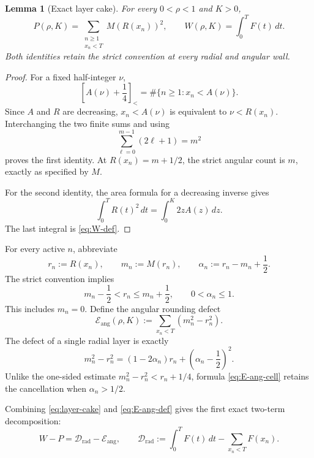 \documentclass[11pt]{article}
\newtheorem{lemma}{Lemma}
\theoremstyle{remark}
\newcommand{\strict}[1]{\left[#1\right]_{<}}
\begin{document}
\begin{lemma}[Exact layer cake]
\label{lem:layer-cake}
For every $0<\rho<1$ and $K>0$,
\begin{equation}
 P(\rho,K)=\sum_{\substack{n\geq1\\x_n<T}}M(R(x_n))^2,
 \qquad
 W(\rho,K)=\int_0^T F(t)\,dt.
 \label{eq:layer-cake}
\end{equation}
Both identities retain the strict convention at every radial and angular
wall.
\end{lemma}

\begin{proof}
For a fixed half-integer $\nu$,
\[
 \strict{A(\nu)+\frac14}
 =\#\{n\geq1:x_n<A(\nu)\}.
\]
Since $A$ and $R$ are decreasing, $x_n<A(\nu)$ is equivalent to
$\nu<R(x_n)$.  Interchanging the two finite sums and using
\[
 \sum_{\ell=0}^{m-1}(2\ell+1)=m^2
\]
proves the first identity.  At $R(x_n)=m+1/2$, the strict angular count is
$m$, exactly as specified by $M$.

For the second identity, the area formula for a decreasing inverse gives
\[
 \int_0^T R(t)^2\,dt
 =\int_0^K2zA(z)\,dz.
\]
The last integral is \eqref{eq:W-def}.
\end{proof}

For every active $n$, abbreviate
\begin{equation}
 r_n:=R(x_n),
 \qquad m_n:=M(r_n),
 \qquad
 \alpha_n:=r_n-m_n+\frac12.
 \label{eq:angular-phase}
\end{equation}
The strict convention implies
\begin{equation}
 m_n-\frac12<r_n\leq m_n+\frac12,
 \qquad 0<\alpha_n\leq1.
 \label{eq:angular-cell}
\end{equation}
This includes $m_n=0$.  Define the angular rounding defect
\begin{equation}
 \mathcal E_{\mathrm{ang}}(\rho,K)
 :=\sum_{x_n<T}(m_n^2-r_n^2).
 \label{eq:E-ang-def}
\end{equation}
The defect of a single radial layer is exactly
\begin{equation}
 m_n^2-r_n^2
 =(1-2\alpha_n)r_n
  +\left(\alpha_n-\frac12\right)^2.
 \label{eq:E-ang-cell}
\end{equation}
Unlike the one-sided estimate
$m_n^2-r_n^2<r_n+1/4$, formula
\eqref{eq:E-ang-cell} retains the cancellation when
$\alpha_n>1/2$.

Combining \eqref{eq:layer-cake} and \eqref{eq:E-ang-def} gives the first
exact two-term decomposition:
\begin{equation}
 W-P=\mathcal D_{\mathrm{rad}}-\mathcal E_{\mathrm{ang}},
 \qquad
 \mathcal D_{\mathrm{rad}}
 :=\int_0^TF(t)\,dt-\sum_{x_n<T}F(x_n).
 \label{eq:two-term-basic}
\end{equation}
\end{document}
